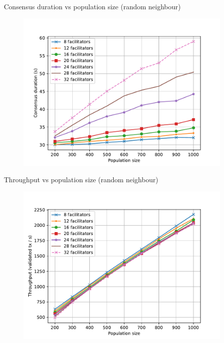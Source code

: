 \documentclass{beamer}
\begin{document}
\begin{frame}{Consensus duration vs population size (random neighbour)}
  \begin{figure}[h]
  \includegraphics[width=0.95\textwidth]{result-rand-cons-vs-pop}
  \centering
  \end{figure}
\end{frame}

\begin{frame}{Throughput vs population size (random neighbour)}
  \begin{figure}[h]
  \includegraphics[width=0.95\textwidth]{result-rand-throughput-vs-pop}
  \centering
  \end{figure}
\end{frame}
\end{document}
